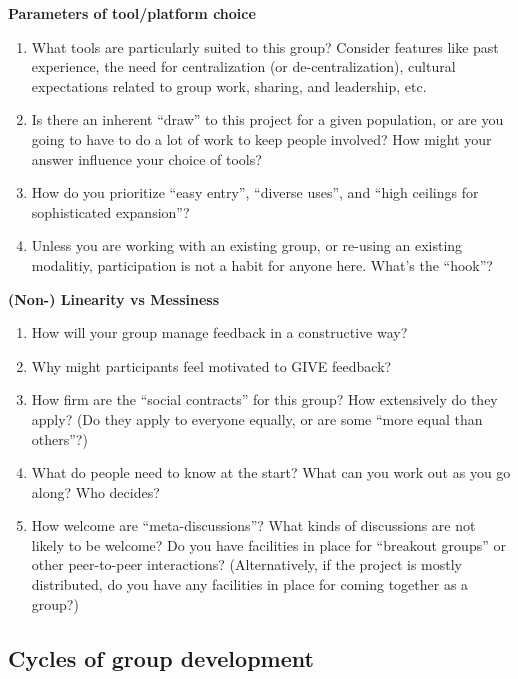 \textbf{Parameters of tool/platform choice}

\begin{enumerate}
\item
  What tools are particularly suited to this group? Consider features
  like past experience, the need for centralization (or
  de-centralization), cultural expectations related to group work,
  sharing, and leadership, etc.
\item
  Is there an inherent ``draw'' to this project for a given population,
  or are you going to have to do a lot of work to keep people involved?
  How might your answer influence your choice of tools?
\item
  How do you prioritize ``easy entry'', ``diverse uses'', and ``high
  ceilings for sophisticated expansion''?
\item
  Unless you are working with an existing group, or re-using an existing
  modalitiy, participation is not a habit for anyone here. What's the
  ``hook''?
\end{enumerate}

\textbf{(Non-) Linearity vs Messiness}

\begin{enumerate}
\item
  How will your group manage feedback in a constructive way?
\item
  Why might participants feel motivated to GIVE feedback?
\item
  How firm are the ``social contracts'' for this group? How extensively
  do they apply? (Do they apply to everyone equally, or are some ``more
  equal than others''?)
\item
  What do people need to know at the start? What can you work out as you
  go along? Who decides?
\item
  How welcome are ``meta-discussions''? What kinds of discussions are
  not likely to be welcome? Do you have facilities in place for
  ``breakout groups'' or other peer-to-peer interactions?
  (Alternatively, if the project is mostly distributed, do you have any
  facilities in place for coming together as a group?)
\end{enumerate}

\subsection{Cycles of group development}

